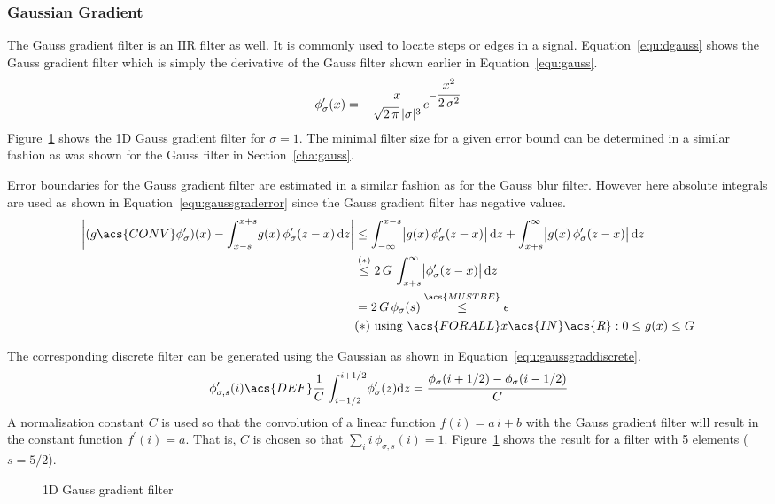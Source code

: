 \documentclass[12pt,a4paper,oneside,openright]{book}
\newcommand{\Ie}{That is, }
\newcommand{\sct}[1]{Section~\ref{cha:#1}}
\newcommand{\equ}[1]{Equation~\ref{equ:#1}}
\newcommand{\fig}[1]{Figure~\ref{fig:#1}}
\begin{document}
\begin{CJK}{UTF8}{}
\subsubsection{Gaussian Gradient}
The Gauss gradient filter is an \ac{IIR} filter as well. It is commonly used to locate steps or edges in a signal. \equ{dgauss} shows the Gauss gradient filter which is simply the derivative of the Gauss filter shown earlier in \equ{gauss}.
\begin{equation}\label{equ:dgauss}
  \phi^\prime_\sigma(x)=-\cfrac{x}{\sqrt{2\,\pi}\,|\sigma|^3}\,e^{-\cfrac{x^2}{2\,\sigma^2}}
\end{equation}
\fig{sdgauss} shows the \ac{1D} Gauss gradient filter for $\sigma=1$. The minimal filter size for a given error bound can be determined in a similar fashion as was shown for the Gauss filter in \sct{gauss}.

Error boundaries for the Gauss gradient filter are estimated in a similar fashion as for the Gauss blur filter. However here absolute integrals are used as shown in \equ{gaussgraderror} since the Gauss gradient filter has negative values.
\begin{align}\label{equ:gaussgraderror}
  \begin{split}
  \bigg|(g\acs{CONV}\phi^\prime_\sigma)(x)-\int_{x-s}^{x+s}\! g(x)\,\phi^\prime_\sigma(z-x)\,\mathrm{d}z\bigg|&\le\int_{-\infty}^{x-s}\!\big|g(x)\,\phi^\prime_\sigma(z-x)\big|\,\mathrm{d}z+\int_{x+s}^{\infty}\! \big|g(x)\,\phi^\prime_\sigma(z-x)\big|\,\mathrm{d}z\\
  &\overset{\mathrm{(*)}}{\le} 2\,G\,\int_{x+s}^{\infty}\! \big|\phi^\prime_\sigma(z-x)\big|\,\mathrm{d}z\,\\
  &=2\,G\,\phi_\sigma(s)\overset{\acs{MUSTBE}}{\le}\epsilon\\
  &\mathrm{(*)\ using\ }\acs{FORALL}x\acs{IN}\acs{R}:0\le g(x)\le G
  \end{split}
\end{align}

The corresponding discrete filter can be generated using the Gaussian as shown in \equ{gaussgraddiscrete}.
\begin{equation}\label{equ:gaussgraddiscrete}
  \phi^\prime_{\sigma,s}(i)\acs{DEF}\cfrac{1}{C}\,\int_{i-1/2}^{i+1/2}\! \phi^\prime_\sigma(z)\mathrm{d}z=\cfrac{\phi_\sigma(i+1/2)-\phi_\sigma(i-1/2)}{C}
\end{equation}
A normalisation constant $C$ is used so that the convolution of a linear function $f(i)=a\,i+b$ with the Gauss gradient filter will result in the constant function $f^\prime(i)=a$. \Ie $C$ is chosen so that $\displaystyle\sum_i i\,\phi_{\sigma,s}(i)=1$. \fig{sdgauss} shows the result for a filter with 5 elements ($s=5/2$).
\begin{figure}[htbp]
  \begin{center}
    \caption{\acs{1D} Gauss gradient filter\label{fig:sdgauss}}
  \end{center}
\end{figure}


\end{CJK}
\end{document}
